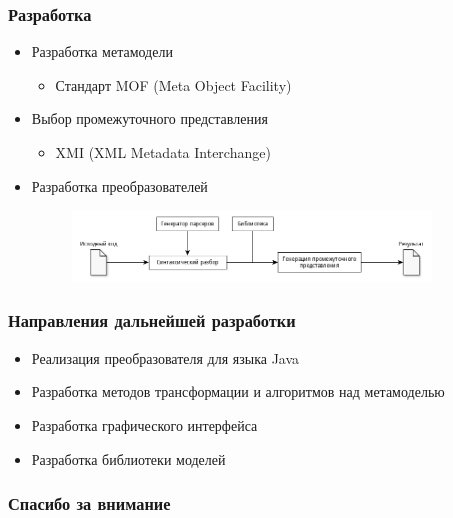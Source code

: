 \documentclass{beamer}
\begin{document}
\begin{frame}
\frametitle{Разработка}

\begin{itemize}
    \item Разработка метамодели
        \begin{itemize}
            \item Стандарт MOF (Meta Object Facility)
        \end{itemize}
    \item Выбор промежуточного представления
        \begin{itemize}
            \item XMI (XML Metadata Interchange)
        \end{itemize}
    \item Разработка преобразователей
        \begin{figure}[h!]
            \begin{center}
                \includegraphics[width=0.9\textwidth]{img/parser_architecture.png}
            \end{center}
        \end{figure}
\end{itemize}

\end{frame}

\begin{frame}
\frametitle{Направления дальнейшей разработки}

\begin{itemize}
    \item Реализация преобразователя для языка Java
    \item Разработка методов трансформации и алгоритмов над метамоделью
    \item Разработка графического интерфейса
    \item Разработка библиотеки моделей
\end{itemize}

\end{frame}

\begin{frame}
\frametitle{Спасибо за внимание}
\end{frame}
\end{document}
